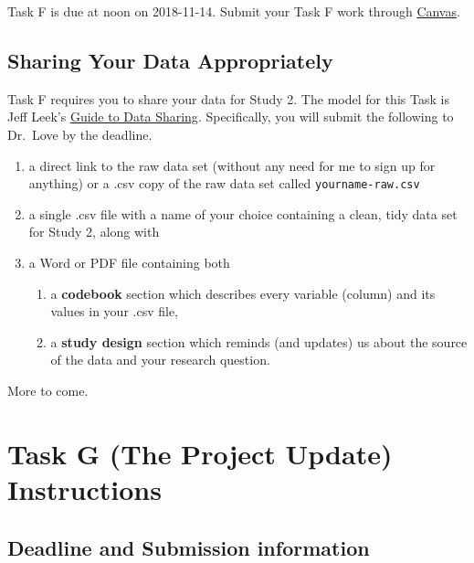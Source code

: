 \documentclass[]{book}
\providecommand{\tightlist}{%
  \setlength{\itemsep}{0pt}\setlength{\parskip}{0pt}}
\theoremstyle{definition}
\theoremstyle{definition}
\theoremstyle{definition}
\theoremstyle{remark}
\begin{document}
Task F is due at noon on 2018-11-14. Submit your Task F work through
\href{https://canvas.case.edu/}{Canvas}.

\hypertarget{sharing-your-data-appropriately}{%
\section{Sharing Your Data
Appropriately}\label{sharing-your-data-appropriately}}

Task F requires you to share your data for Study 2. The model for this
Task is Jeff Leek's \href{https://github.com/jtleek/datasharing}{Guide
to Data Sharing}. Specifically, you will submit the following to
Dr.~Love by the deadline.

\begin{enumerate}
\def\labelenumi{\arabic{enumi}.}
\tightlist
\item
  a direct link to the raw data set (without any need for me to sign up
  for anything) or a .csv copy of the raw data set called
  \texttt{yourname-raw.csv}
\item
  a single .csv file with a name of your choice containing a clean, tidy
  data set for Study 2, along with
\item
  a Word or PDF file containing both

  \begin{enumerate}
  \def\labelenumii{\alph{enumii}.}
  \tightlist
  \item
    a \textbf{codebook} section which describes every variable (column)
    and its values in your .csv file,
  \item
    a \textbf{study design} section which reminds (and updates) us about
    the source of the data and your research question.
  \end{enumerate}
\end{enumerate}

More to come.

\hypertarget{taskG}{%
\chapter{Task G (The Project Update) Instructions}\label{taskG}}

\hypertarget{deadline-and-submission-information-6}{%
\section{Deadline and Submission
information}\label{deadline-and-submission-information-6}}
\end{document}
